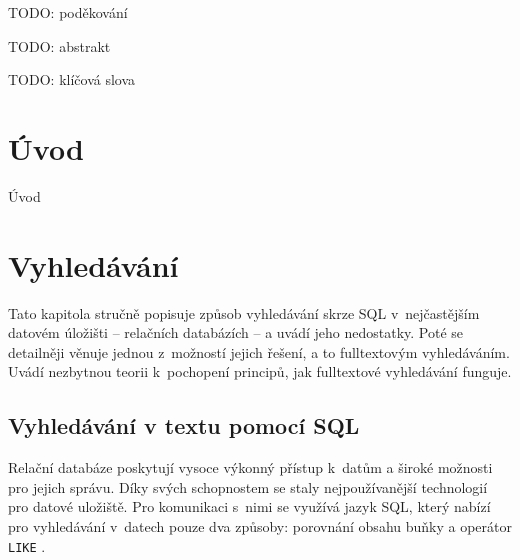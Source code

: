 \documentclass[11pt,oneside]{fithesis2}
\begin{document}
\FrontMatter
\ThesisTitlePage

\begin{ThesisDeclaration}
  \DeclarationText
  \AdvisorName
\end{ThesisDeclaration}

\begin{ThesisThanks}
TODO: poděkování
\end{ThesisThanks}

\begin{ThesisAbstract}
TODO: abstrakt
\end{ThesisAbstract}

\begin{ThesisKeyWords}
TODO: klíčová slova
\end{ThesisKeyWords}

\MainMatter

\tableofcontents



\chapter{Úvod}
Úvod

\chapter{Vyhledávání}
Tato kapitola stručně popisuje způsob vyhledávání skrze SQL v~nejčastějším datovém úložišti -- relačních databázích -- a uvádí jeho nedostatky. Poté se detailněji věnuje jednou z~možností jejich řešení, a to fulltextovým vyhledáváním. Uvádí nezbytnou 
teorii k~pochopení principů, jak fulltextové vyhledávání funguje.

\section{Vyhledávání v textu pomocí SQL}
\label{SQLsection}
Relační databáze poskytují vysoce výkonný přístup k~datům a široké možnosti pro jejich správu. Díky svých schopnostem se staly nejpoužívanější technologií pro datové uložiště. Pro komunikaci s~nimi se využívá jazyk SQL, který nabízí pro vyhledávání v~datech pouze dva způsoby: porovnání obsahu buňky a operátor \texttt{LIKE} \cite{MistrovstviMySQL}.
\end{document}
